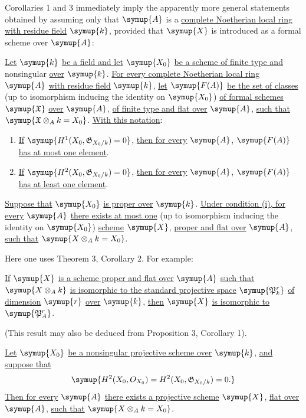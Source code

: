 Corollaries 1 and 3 immediately imply the apparently more general statements
obtained by assuming only that $\symup{A}$ is a \uline{complete Noetherian local ring with
residue field} $\symup{k}$, provided that $\symup{X}$ is introduced as a formal scheme over
$\symup{A}$:

 \uline{Let} $\symup{k}$ \uline{be a field and let} $\symup{X_0}$ \uline{be a scheme of finite
type and} nonsingular \uline{over} $\symup{k}$. \uline{For every complete Noetherian local ring} $\symup{A}$
\uline{with residue field} $\symup{k}$, \uline{let} $\symup{F(A)}$ \uline{be the set of classes} (up to isomorphism
inducing the identity on $\symup{X_0}$) 
\uline{of formal schemes} $\symup{\mathfrak X}$ \uline{over} $\symup{A}$, \uline{of
finite type and flat over} $\symup{A}$, \uline{such that} $\symup{\mathfrak X\otimes_A k=X_0}$. \uline{With
this notation}:
\begin{enumerate}
  \item[\textnormal{i.}] \uline{If} $\symup{H^1(X_0,\mathfrak G_{X_0/k})=0}$, \uline{then for every} $\symup{A}$,
    $\symup{F(A)}$ \uline{has at most one element}.
  \item[\textnormal{ii.}] \uline{If} $\symup{H^2(X_0,\mathfrak G_{X_0/k})=0}$, \uline{then for every} $\symup{A}$,
    $\symup{F(A)}$ \uline{has at least one element}.
\end{enumerate}


 \uline{Suppose that} $\symup{X_0}$ \uline{is proper over} $\symup{k}$. \uline{Under condition
(i), for every} $\symup{A}$ \uline{there exists at most one} (up to isomorphism
inducing the identity on $\symup{X_0}$) \uline{scheme} $\symup{X}$, \uline{proper and flat over} $\symup{A}$, \uline{such that}
$\symup{X\otimes_A k=X_0}$.

Here one uses Theorem 3, Corollary 2. For example:

 \uline{If} $\symup{X}$ \uline{is a scheme proper and flat over} $\symup{A}$ \uline{such that}
$\symup{X\otimes_A k}$ \uline{is isomorphic to the standard projective space}
$\symup{\mathfrak P_k^r}$ \uline{of dimension} $\symup{r}$ \uline{over} $\symup{k}$, \uline{then} $\symup{X}$ \uline{is isomorphic to}
$\symup{\mathfrak P_A^r}$.

(This result may also be deduced from Proposition 3, Corollary 1).

 \uline{Let} $\symup{X_0}$ \uline{be a nonsingular projective scheme over} $\symup{k}$,
\uline{and suppose that}
\[
  \symup{H^2(X_0,O_{X_0})=H^2(X_0,\mathfrak G_{X_0/k})=0.}
\]
\uline{Then for every} $\symup{A}$ \uline{there exists a projective scheme} $\symup{X}$, \uline{flat over} $\symup{A}$, \uline{such
that} $\symup{X\otimes_A k=X_0}$.

